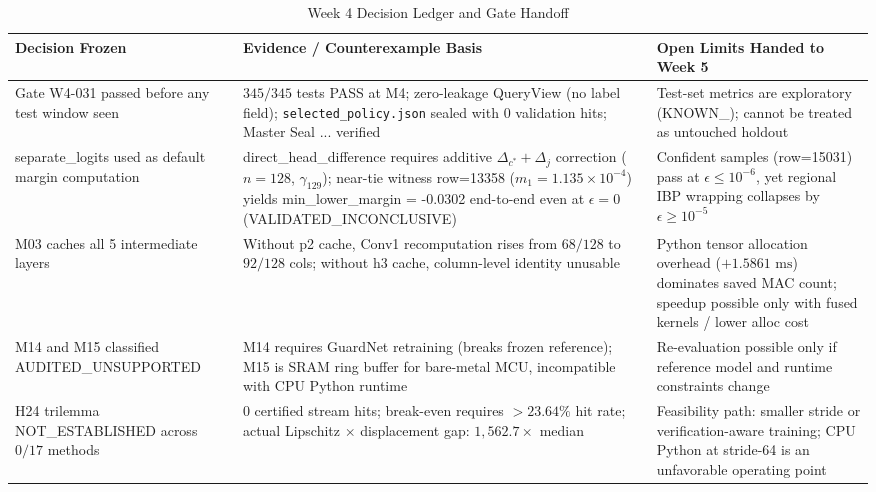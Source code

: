 \documentclass[11pt,oneside,a4paper]{report}
\newcommand{\code}[1]{{\small\upshape\ttfamily #1}}
\newcommand{\pathcode}[1]{{\small\upshape\ttfamily\nolinkurl{#1}}}
\theoremstyle{remark}
\begin{document}
\begin{table}[htbp]
\centering\small
\caption{Week 4 Decision Ledger and Gate Handoff}\label{tab:w4_ledger}
\begin{tabularx}{\textwidth}{@{}P{3.5cm}YP{4.1cm}@{}}
\toprule
\textbf{Decision Frozen} & \textbf{Evidence / Counterexample Basis} & \textbf{Open Limits Handed to Week 5} \\
\midrule
Gate \code{W4-031} passed before any test window seen & $345/345$ tests PASS at M4; zero-leakage \code{QueryView} (no label field); \pathcode{selected_policy.json} sealed with $0$ validation hits; Master Seal \code{56806762...} verified & Test-set metrics are exploratory (\code{KNOWN\_}\allowbreak\code{TEST\_}\allowbreak\code{EXPLORATORY}); cannot be treated as untouched holdout \\
\addlinespace
\code{separate\_logits} used as default margin computation & \code{direct\_head\_difference} requires additive $\Delta_{c^*} + \Delta_j$ correction ($n=128$, $\gamma_{129}$); near-tie witness \code{row=13358} ($m_1 = 1.135 \times 10^{-4}$) yields \code{min\_lower\_margin = -0.0302} end-to-end even at $\epsilon = 0$ (\code{VALIDATED\_INCONCLUSIVE}) & Confident samples (\code{row=15031}) pass at $\epsilon \le 10^{-6}$, yet regional IBP wrapping collapses by $\epsilon \ge 10^{-5}$ \\
\addlinespace
\code{M03} caches all 5 intermediate layers & Without \code{p2} cache, Conv1 recomputation rises from $68/128$ to $92/128$ cols; without \code{h3} cache, column-level identity unusable & Python tensor allocation overhead ($+1.5861\text{ ms}$) dominates saved MAC count; speedup possible only with fused kernels / lower alloc cost \\
\addlinespace
\code{M14} and \code{M15} classified \code{AUDITED\_UNSUPPORTED} & \code{M14} requires GuardNet retraining (breaks frozen reference); \code{M15} is SRAM ring buffer for bare-metal MCU, incompatible with CPU Python runtime & Re-evaluation possible only if reference model and runtime constraints change \\
\addlinespace
\code{H24} trilemma \code{NOT\_ESTABLISHED} across $0/17$ methods & $0$ certified stream hits; break-even requires $>23.64\%$ hit rate; actual Lipschitz $\times$ displacement gap: $1{,}562.7\times$ median & Feasibility path: smaller stride or verification-aware training; CPU Python at stride-64 is an unfavorable operating point \\
\bottomrule
\end{tabularx}
\end{table}
\end{document}
